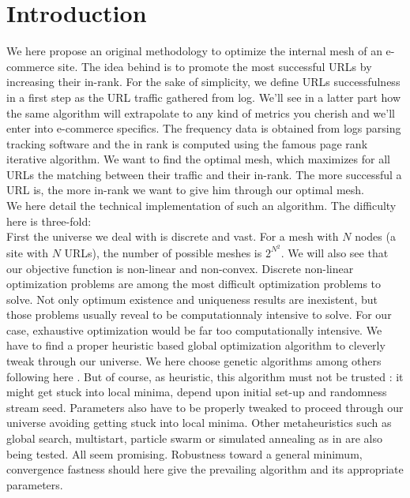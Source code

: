 \documentclass{iSWAGArticle}
\begin{document}
  \section{Introduction}
  We here propose an original methodology to optimize the internal mesh of an e-commerce site.
  The idea behind is to promote the most successful URLs by increasing their in-rank.  
  For the sake of simplicity, we define URLs successfulness in a first step as the URL traffic gathered from log.
  We'll see in a latter part how the same algorithm will extrapolate to any kind of metrics you cherish and we'll enter into e-commerce specifics.
  The frequency data is obtained from logs parsing tracking software and the in rank is computed using the famous page rank iterative algorithm.  
  We want to find the optimal mesh, which maximizes for all URLs the matching between their traffic and their in-rank. 
  The more successful a URL is, the more in-rank we want to give him through our optimal mesh.
  \\\newline
  We here detail the technical implementation of such an algorithm.
  The difficulty here is three-fold:
  \\
  \indent
  First the universe we deal with is discrete and vast. For a mesh with $N$ nodes (a site with $N$ URLs), the number of possible meshes is $2^{N^{2}}$. 
  We will also see that our objective function is non-linear and non-convex.  Discrete non-linear optimization problems are among the most difficult optimization problems to solve. 
  Not only optimum existence and uniqueness results are inexistent, but those problems usually reveal to be computationnaly intensive to solve. 
  For our case, exhaustive optimization would be far too computationally intensive. We have to find a proper heuristic based global optimization algorithm to cleverly tweak through our universe.
  We here choose genetic algorithms among others following here \cite{gen_algo_web}. 
  But of course, as heuristic, this algorithm must not be trusted : it might get stuck into local minima, depend upon initial set-up and randomness stream seed. 
  Parameters also have to be properly tweaked to proceed through our universe avoiding getting stuck into local minima.
  Other metaheuristics such as global search, multistart, particle swarm or simulated annealing as in \cite{sim_annealing} 
  are also being tested. All seem promising. Robustness toward a general minimum, convergence fastness should here give the prevailing algorithm and its appropriate parameters. 
  \\
\end{document}
